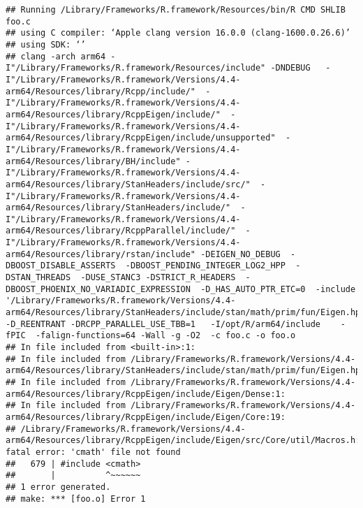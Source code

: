 \documentclass[
]{article}
\newenvironment{Shaded}{\begin{snugshade}}{\end{snugshade}}
\newcommand{\CommentTok}[1]{\textcolor[rgb]{0.56,0.35,0.01}{\textit{#1}}}
\newcommand{\NormalTok}[1]{#1}
\newcommand{\SpecialCharTok}[1]{\textcolor[rgb]{0.81,0.36,0.00}{\textbf{#1}}}
\begin{document}
\begin{verbatim}
## Running /Library/Frameworks/R.framework/Resources/bin/R CMD SHLIB foo.c
## using C compiler: ‘Apple clang version 16.0.0 (clang-1600.0.26.6)’
## using SDK: ‘’
## clang -arch arm64 -I"/Library/Frameworks/R.framework/Resources/include" -DNDEBUG   -I"/Library/Frameworks/R.framework/Versions/4.4-arm64/Resources/library/Rcpp/include/"  -I"/Library/Frameworks/R.framework/Versions/4.4-arm64/Resources/library/RcppEigen/include/"  -I"/Library/Frameworks/R.framework/Versions/4.4-arm64/Resources/library/RcppEigen/include/unsupported"  -I"/Library/Frameworks/R.framework/Versions/4.4-arm64/Resources/library/BH/include" -I"/Library/Frameworks/R.framework/Versions/4.4-arm64/Resources/library/StanHeaders/include/src/"  -I"/Library/Frameworks/R.framework/Versions/4.4-arm64/Resources/library/StanHeaders/include/"  -I"/Library/Frameworks/R.framework/Versions/4.4-arm64/Resources/library/RcppParallel/include/"  -I"/Library/Frameworks/R.framework/Versions/4.4-arm64/Resources/library/rstan/include" -DEIGEN_NO_DEBUG  -DBOOST_DISABLE_ASSERTS  -DBOOST_PENDING_INTEGER_LOG2_HPP  -DSTAN_THREADS  -DUSE_STANC3 -DSTRICT_R_HEADERS  -DBOOST_PHOENIX_NO_VARIADIC_EXPRESSION  -D_HAS_AUTO_PTR_ETC=0  -include '/Library/Frameworks/R.framework/Versions/4.4-arm64/Resources/library/StanHeaders/include/stan/math/prim/fun/Eigen.hpp'  -D_REENTRANT -DRCPP_PARALLEL_USE_TBB=1   -I/opt/R/arm64/include    -fPIC  -falign-functions=64 -Wall -g -O2  -c foo.c -o foo.o
## In file included from <built-in>:1:
## In file included from /Library/Frameworks/R.framework/Versions/4.4-arm64/Resources/library/StanHeaders/include/stan/math/prim/fun/Eigen.hpp:22:
## In file included from /Library/Frameworks/R.framework/Versions/4.4-arm64/Resources/library/RcppEigen/include/Eigen/Dense:1:
## In file included from /Library/Frameworks/R.framework/Versions/4.4-arm64/Resources/library/RcppEigen/include/Eigen/Core:19:
## /Library/Frameworks/R.framework/Versions/4.4-arm64/Resources/library/RcppEigen/include/Eigen/src/Core/util/Macros.h:679:10: fatal error: 'cmath' file not found
##   679 | #include <cmath>
##       |          ^~~~~~~
## 1 error generated.
## make: *** [foo.o] Error 1
\end{verbatim}

\begin{Shaded}
\end{Shaded}
\end{document}
